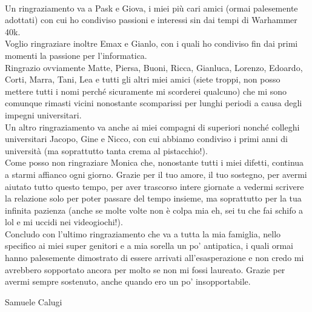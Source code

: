 \\Un ringraziamento va a Pask e Giova, i miei più cari amici (ormai palesemente adottati) con cui ho condiviso passioni e interessi  sin dai tempi di Warhammer 40k.
\\Voglio ringraziare inoltre Emax e Gianlo, con i quali ho condiviso fin dai primi momenti la passione per l'informatica.
\\Ringrazio ovviamente Matte, Piersa, Buoni, Ricca, Gianluca, Lorenzo, Edoardo, Corti, Marra, Tani, Lea e tutti gli altri miei amici (siete troppi, non posso mettere tutti i nomi perché sicuramente mi scorderei qualcuno) che mi sono comunque rimasti vicini nonostante scomparissi per lunghi periodi a causa degli impegni universitari.
\\Un altro ringraziamento va anche ai miei compagni di superiori nonché colleghi universitari Jacopo, Gine e Nicco, con cui abbiamo condiviso i primi anni di università (ma soprattutto tanta crema al pistacchio!).
\smallskip
\\Come posso non ringraziare Monica che, nonostante tutti i miei difetti, continua a starmi affianco ogni giorno. Grazie per il tuo amore, il tuo sostegno, per avermi aiutato tutto questo tempo, per aver trascorso intere giornate a vedermi scrivere la relazione solo per poter passare del tempo insieme, ma soprattutto per la tua infinita pazienza (anche se molte volte non è colpa mia eh, sei tu che fai schifo a lol e mi uccidi nei videogiochi!). 
\\Concludo con l'ultimo ringraziamento che va a tutta la mia famiglia, nello specifico ai miei super genitori e a mia sorella un po' antipatica, i quali ormai hanno palesemente dimostrato di essere arrivati all'esasperazione e non credo mi avrebbero sopportato ancora per molto se non mi fossi laureato. Grazie per avermi sempre sostenuto, anche quando ero un po' insopportabile.
\begin{flushright}
Samuele Calugi
\end{flushright}
\thispagestyle{empty}